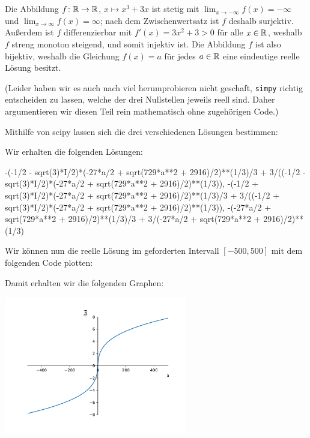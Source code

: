 \section{}

Die Abbildung $f \colon \mathbb{R} \to \mathbb{R}$, $x \mapsto x^3 + 3x$ ist stetig mit $\lim_{x \to -\infty} f(x) = -\infty$ und $\lim_{x \to \infty} f(x) = \infty$;
nach dem Zwischenwertsatz ist $f$ deshalb surjektiv.
Außerdem ist $f$ differenzierbar mit $f'(x) = 3 x^2 + 3 > 0$ für alle $x \in \mathbb{R}$, weshalb $f$ streng monoton steigend, und somit injektiv ist.
Die Abbildung $f$ ist also bijektiv, weshalb die Gleichung $f(x) = a$ für jedes $a \in \mathbb{R}$ eine eindeutige reelle Lösung besitzt.

(Leider haben wir es auch nach viel herumprobieren nicht geschaft, \texttt{simpy} richtig entscheiden zu lassen, welche der drei Nullstellen jeweils reell sind.
Daher argumentieren wir diesen Teil rein mathematisch ohne zugehörigen Code.)

Mithilfe von scipy lassen sich die drei verschiedenen Lösungen bestimmen:



Wir erhalten die folgenden Lösungen:

\begin{consoleoutput}
{-(-1/2 - sqrt(3)*I/2)*(-27*a/2 + sqrt(729*a**2 + 2916)/2)**(1/3)/3 + 3/((-1/2 - sqrt(3)*I/2)*(-27*a/2 + sqrt(729*a**2 + 2916)/2)**(1/3)), -(-1/2 + sqrt(3)*I/2)*(-27*a/2 + sqrt(729*a**2 + 2916)/2)**(1/3)/3 + 3/((-1/2 + sqrt(3)*I/2)*(-27*a/2 + sqrt(729*a**2 + 2916)/2)**(1/3)), -(-27*a/2 + sqrt(729*a**2 + 2916)/2)**(1/3)/3 + 3/(-27*a/2 + sqrt(729*a**2 + 2916)/2)**(1/3)}
\end{consoleoutput}

Wir können nun die reelle Lösung im geforderten Intervall $[-500, 500]$ mit dem folgenden Code plotten:



Damit erhalten wir die folgenden Graphen:

\begin{center}
  \includegraphics[width = 0.6\textwidth]{chapter_05/exercise_05_26_figure.pdf}
\end{center}
